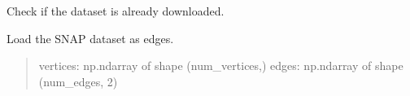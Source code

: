 \documentclass[letterpaper,10pt,english]{sphinxmanual}
\begin{document}
\begin{fulllineitems}
\begin{fulllineitems}
\end{fulllineitems}


\begin{fulllineitems}
\label{\detokenize{api_reference:graphem.datasets.SNAPDataset.is_downloaded}}
\pysigstartsignatures
{}
\pysigstopsignatures
\sphinxAtStartPar
Check if the dataset is already downloaded.

\end{fulllineitems}


\begin{fulllineitems}
\label{\detokenize{api_reference:graphem.datasets.SNAPDataset.load}}
\pysigstartsignatures
{}
\pysigstopsignatures
\sphinxAtStartPar
Load the SNAP dataset as edges.
\begin{quote}\begin{description}
\sphinxAtStartPar
\begin{description}
\sphinxAtStartPar
vertices: np.ndarray of shape (num\_vertices,)
edges: np.ndarray of shape (num\_edges, 2)

\end{description}


\sphinxAtStartPar
{}

\end{description}\end{quote}

\end{fulllineitems}


\end{fulllineitems}

\end{document}
